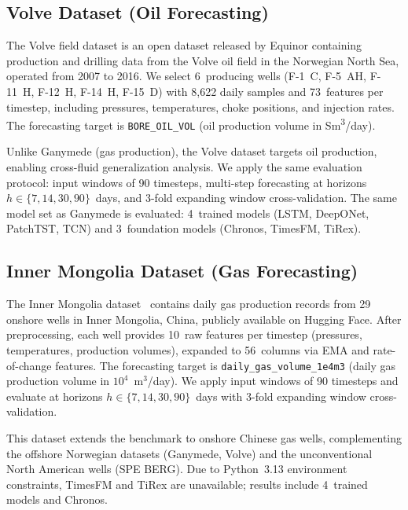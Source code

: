 \documentclass[conference]{IEEEtran}
\begin{document}
\subsection{Volve Dataset (Oil Forecasting)}

The Volve field dataset \cite{volve} is an open dataset released by Equinor containing production and drilling data from the Volve oil field in the Norwegian North Sea, operated from 2007 to 2016. We select 6~producing wells (F-1~C, F-5~AH, F-11~H, F-12~H, F-14~H, F-15~D) with 8{,}622 daily samples and 73~features per timestep, including pressures, temperatures, choke positions, and injection rates. The forecasting target is \texttt{BORE\_OIL\_VOL} (oil production volume in Sm\textsuperscript{3}/day).

Unlike Ganymede (gas production), the Volve dataset targets oil production, enabling cross-fluid generalization analysis. We apply the same evaluation protocol: input windows of 90 timesteps, multi-step forecasting at horizons $h \in \{7, 14, 30, 90\}$~days, and 3-fold expanding window cross-validation. The same model set as Ganymede is evaluated: 4~trained models (LSTM, DeepONet, PatchTST, TCN) and 3~foundation models (Chronos, TimesFM, TiRex).

\subsection{Inner Mongolia Dataset (Gas Forecasting)}

The Inner Mongolia dataset~\cite{inner_mongolia} contains daily gas production records from 29 onshore wells in Inner Mongolia, China, publicly available on Hugging Face. After preprocessing, each well provides 10~raw features per timestep (pressures, temperatures, production volumes), expanded to 56~columns via EMA and rate-of-change features. The forecasting target is \texttt{daily\_gas\_volume\_1e4m3} (daily gas production volume in $10^4$~m$^3$/day). We apply input windows of 90 timesteps and evaluate at horizons $h \in \{7, 14, 30, 90\}$~days with 3-fold expanding window cross-validation.

This dataset extends the benchmark to onshore Chinese gas wells, complementing the offshore Norwegian datasets (Ganymede, Volve) and the unconventional North American wells (SPE BERG). Due to Python~3.13 environment constraints, TimesFM and TiRex are unavailable; results include 4~trained models and Chronos.

\end{document}
